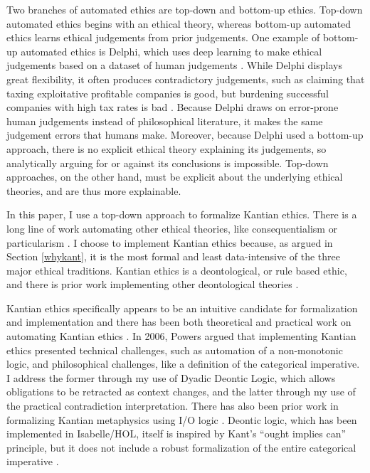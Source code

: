 \begin{isabellebody}
\begin{isamarkuptext}
Two branches of automated ethics are top-down and bottom-up ethics. Top-down automated ethics begins 
with an ethical theory, whereas bottom-up automated ethics learns ethical judgements from prior 
judgements. One example of bottom-up automated ethics is Delphi, which uses deep learning to make 
ethical judgements based on a dataset of human judgements \citep{delphi}. While Delphi displays great 
flexibility, it often produces contradictory judgements, such as claiming that taxing exploitative 
profitable companies is good, but burdening successful companies with high tax rates is bad \citep{verge}. 
Because Delphi draws on error-prone human judgements instead of philosophical literature, it makes 
the same judgement errors that humans make. Moreover, because Delphi used a bottom-up approach, 
there is no explicit ethical theory explaining its judgements, so analytically arguing for or 
against its conclusions is impossible. Top-down approaches, on the other hand, must be explicit about 
the underlying ethical theories, and are thus more explainable. 

In this paper, I use a top-down approach to formalize Kantian ethics. There is a long line of work 
automating other ethical theories, like consequentialism \citep{util1, util2} or particularism 
\citep{particularism1, particularism2}. I choose to implement Kantian ethics because, as argued in 
Section \ref{whykant}, it is the most formal and least data-intensive of the three major ethical 
traditions. Kantian ethics is a deontological, or rule based ethic, and there is prior work 
implementing other deontological theories \citep{dde, deon1, deon2}. 

Kantian ethics specifically appears to be an intuitive candidate for formalization and implementation 
and there has been both theoretical and practical work on automating Kantian ethics \citep{powers, lin}. 
In 2006, Powers \citep{powers} argued that implementing Kantian ethics presented technical challenges, 
such as automation of a non-monotonic logic, and philosophical challenges, like a definition of the 
categorical imperative. I address the former through my use of Dyadic Deontic Logic, which allows 
obligations to be retracted as context changes, and the latter through my use of the practical 
contradiction interpretation. There has also been prior work in formalizing Kantian metaphysics 
using I/O logic \citep{io}. Deontic logic, which has been implemented in Isabelle/HOL, itself is inspired 
by Kant's ``ought implies can'' principle, but it does not include a robust formalization of the entire 
categorical imperative \citep{cresswell}.


\end{isamarkuptext}
\end{isabellebody}
